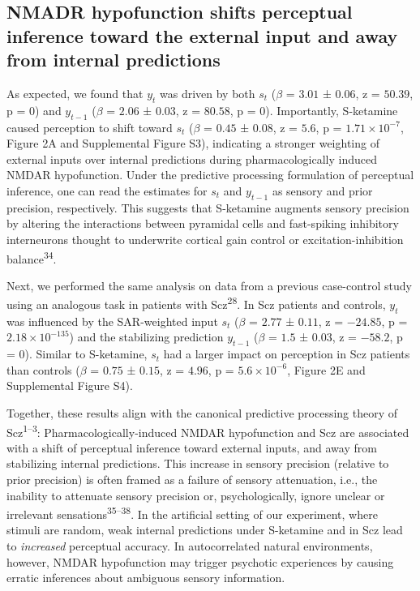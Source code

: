 \documentclass[
]{article}
\begin{document}
\subsection{NMADR hypofunction shifts perceptual inference toward the
external input and away from internal
predictions}\label{nmadr-hypofunction-shifts-perceptual-inference-toward-the-external-input-and-away-from-internal-predictions}

As expected, we found that \(y_t\) was driven by both \(s_t\) (\(\beta\)
= \(3.01\) ± \(0.06\), z = \(50.39\), p = \(0\)) and \(y_{t-1}\)
(\(\beta\) = \(2.06\) ± \(0.03\), z = \(80.58\), p = \(0\)).
Importantly, S-ketamine caused perception to shift toward \(s_t\)
(\(\beta\) = \(0.45\) ± \(0.08\), z = \(5.6\), p =
\(\ensuremath{1.71\times 10^{-7}}\), Figure 2A and Supplemental Figure
S3), indicating a stronger weighting of external inputs over internal
predictions during pharmacologically induced NMDAR hypofunction. Under
the predictive processing formulation of perceptual inference, one can
read the estimates for \(s_t\) and \(y_{t-1}\) as sensory and prior
precision, respectively. This suggests that S-ketamine augments sensory
precision by altering the interactions between pyramidal cells and
fast-spiking inhibitory interneurons thought to underwrite cortical gain
control or excitation-inhibition balance\textsuperscript{34}.

Next, we performed the same analysis on data from a previous
case-control study using an analogous task in patients with
Scz\textsuperscript{28}. In Scz patients and controls, \(y_t\) was
influenced by the SAR-weighted input \(s_t\) (\(\beta\) = \(2.77\) ±
\(0.11\), z = \(-24.85\), p = \(\ensuremath{2.18\times 10^{-135}}\)) and
the stabilizing prediction \(y_{t-1}\) (\(\beta\) = \(1.5\) ± \(0.03\),
z = \(-58.2\), p = \(0\)). Similar to S-ketamine, \(s_t\) had a larger
impact on perception in Scz patients than controls (\(\beta\) = \(0.75\)
± \(0.15\), z = \(4.96\), p = \(\ensuremath{5.6\times 10^{-6}}\), Figure
2E and Supplemental Figure S4).

Together, these results align with the canonical predictive processing
theory of Scz\textsuperscript{1--3}: Pharmacologically-induced NMDAR
hypofunction and Scz are associated with a shift of perceptual inference
toward external inputs, and away from stabilizing internal predictions.
This increase in sensory precision (relative to prior precision) is
often framed as a failure of sensory attenuation, i.e., the inability to
attenuate sensory precision or, psychologically, ignore unclear or
irrelevant sensations\textsuperscript{35--38}. In the artificial setting
of our experiment, where stimuli are random, weak internal predictions
under S-ketamine and in Scz lead to \emph{increased} perceptual
accuracy. In autocorrelated natural environments, however, NMDAR
hypofunction may trigger psychotic experiences by causing erratic
inferences about ambiguous sensory information.
\end{document}
